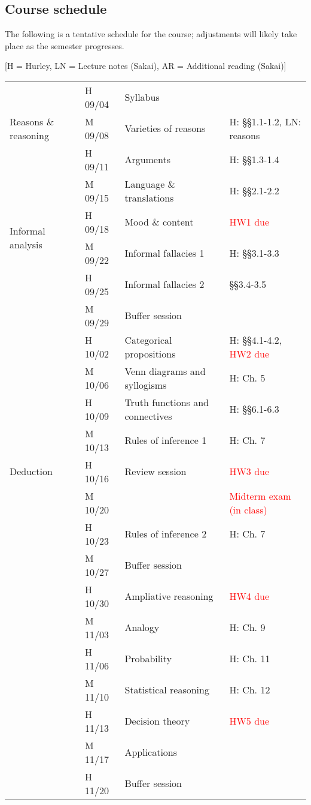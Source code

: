 \documentclass{article}
\begin{document}
\subsection*{Course schedule}
The following is a tentative schedule for the course; adjustments will likely take place as the semester progresses. 

\scriptsize 
[H = Hurley, LN = Lecture notes (Sakai), AR = Additional reading (Sakai)]

\begin{tabular}{|l|l|l|l|}
\hline
\multirow{3}{*}{Reasons \& reasoning} 
 & H 09/04 & Syllabus & \\
 & M 09/08 & Varieties of reasons & H: \S\S1.1-1.2, LN: reasons \\
 & H 09/11 & Arguments & H: \S\S1.3-1.4 \\

\hline
\multirow{4}{*}{Informal analysis} 
 & M 09/15 & Language \& translations & H: \S\S2.1-2.2 \\
 & H 09/18 & Mood \& content &	\textcolor{red}{HW1 due} \\
 & M 09/22 & Informal fallacies 1 & H: \S\S3.1-3.3 \\
 & H 09/25 & Informal fallacies 2 & \S\S3.4-3.5\\
 & M 09/29 & Buffer session & \\

\hline
\multirow{9}{*}{Deduction} 
 & H 10/02 & Categorical propositions & H: \S\S4.1-4.2, \textcolor{red}{HW2 due} \\
 & M 10/06 & Venn diagrams and syllogisms & H: Ch. 5 \\
 & H 10/09 & Truth functions and connectives & H: \S\S6.1-6.3 \\
 & M 10/13 & Rules of inference 1 & H: Ch. 7 \\
 
 & H 10/16 & Review session & \textcolor{red}{HW3 due} \\
 & M 10/20 & & \textcolor{red}{Midterm exam (in class)} \\
 
 & H 10/23 & Rules of inference 2 & H: Ch. 7 \\
 & M 10/27 & Buffer session & \\

\hline 
\multirow{6}{*}{Induction}  
 & H 10/30 & Ampliative reasoning & \textcolor{red}{HW4 due} \\
 & M 11/03 & Analogy & H: Ch. 9 \\
 & H 11/06 & Probability & H: Ch. 11\\
 & M 11/10 & Statistical reasoning & H: Ch. 12 \\
 & H 11/13 & Decision theory & \textcolor{red}{HW5 due} \\
 & M 11/17 & Applications & \\
 & H 11/20 & Buffer session & \\


\end{tabular}
\end{document}
